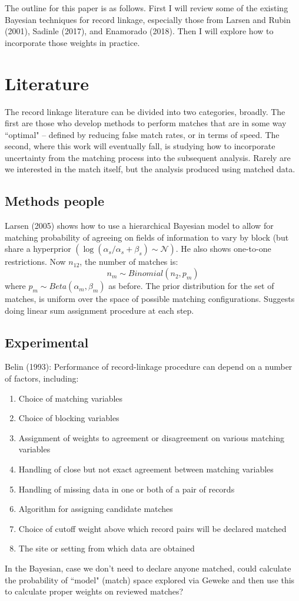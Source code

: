 \documentclass[11pt,reqno]{amsart}
\begin{document}
The outline for this paper is as follows.  First I will review some of the existing Bayesian techniques for record linkage, especially those from Larsen and Rubin (2001), Sadinle (2017), and  Enamorado (2018).  Then I will explore how to incorporate those weights in practice.  

\section{Literature}

The record linkage literature can be divided into two categories, broadly.  The first are those who develop methods to perform matches that are in some way ``optimal" -- defined by reducing false match rates, or in terms of speed.  The second, where this work will eventually fall, is studying how to incorporate uncertainty from the matching process into the subsequent analysis.  Rarely are we interested in the match itself, but the analysis produced using matched data.  
\subsection{Methods people}
Larsen (2005) shows how to use a hierarchical Bayesian model to allow for matching probability of agreeing on fields of information to vary by block (but share a hyperprior $(\log(\alpha_s/\alpha_s+\beta_s) \sim \mathcal{N})$.  He also shows one-to-one restrictions.  Now $n_{12}$, the number of matches is:
\[ n_{m} \sim Binomial(n_2, p_m) \] 
where $p_m \sim Beta(\alpha_m, \beta_m)$ as before. The prior distribution for the set of matches, is uniform over the space of possible matching configurations. Suggests doing linear sum assignment procedure at each step.  %

\subsection{Experimental}
Belin (1993): Performance of record-linkage procedure can depend on a number of factors, including:
\begin{enumerate}
\item Choice of matching variables
\item Choice of blocking variables
\item Assignment of weights to agreement or disagreement on various matching variables
\item Handling of close but not exact agreement between matching variables
\item Handling of missing data in one or both of a pair of records
\item Algorithm for assigning candidate matches
\item Choice of cutoff weight above which record pairs will be declared matched
\item The site or setting from which data are obtained
\end{enumerate}
In the Bayesian, case we don't need to declare anyone matched, could calculate the probability of  ``model" (match) space explored via Geweke and then use this to calculate proper weights on reviewed matches?  
\end{document}
